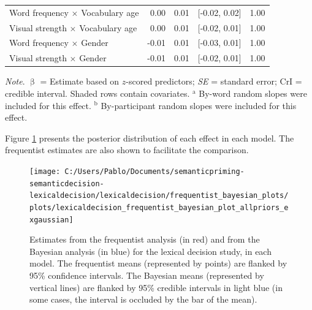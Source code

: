 \documentclass[
  12pt,
  man,floatsintext]{apa7}
\begin{document}
\begin{table}[!h]
\begin{threeparttable}
\begin{tabular}[t]{lrrrr}
\hspace{1em}Word frequency  $\times$  Vocabulary age & 0.00 & 0.01 & {}[-0.02, 0.02] & 1.00\\
\hspace{1em}Visual strength  $\times$  Vocabulary age & 0.00 & 0.01 & {}[-0.02, 0.01] & 1.00\\
\hspace{1em}Word frequency  $\times$  Gender & -0.01 & 0.01 & {}[-0.03, 0.01] & 1.00\\
\hspace{1em}Visual strength  $\times$  Gender & -0.01 & 0.01 & {}[-0.02, 0.01] & 1.00\\
\bottomrule
\end{tabular}
\begin{tablenotes}
\item \textit{\linebreak} 
\item \textit{Note}. $\upbeta$ = Estimate based on $z$-scored predictors; \textit{SE} = standard error; \linebreak \phantom{.}CrI = credible interval. Shaded rows contain covariates. \linebreak \linebreak \phantom{.}$^{\text{a}}$ By-word random slopes were included for this effect. \linebreak \phantom{.}$^{\text{b}}$ By-participant random slopes were included for this effect.
\end{tablenotes}
\end{threeparttable}
\end{table}

\clearpage

Figure \ref{fig:lexicaldecision-frequentist-bayesian-plot-allpriors-exgaussian} presents the posterior distribution of each effect in each model. The frequentist estimates are also shown to facilitate the comparison.

\begin{figure}

{\centering \texttt{[image: C:/Users/Pablo/Documents/semanticpriming-semanticdecision-lexicaldecision/lexicaldecision/frequentist\_bayesian\_plots/plots/lexicaldecision\_frequentist\_bayesian\_plot\_allpriors\_exgaussian]} 

}

\caption{Estimates from the frequentist analysis (in red) and from the Bayesian analysis (in blue) for the lexical decision study, in each model. The frequentist means (represented by points) are flanked by 95\% confidence intervals. The Bayesian means (represented by vertical lines) are flanked by 95\% credible intervals in light blue (in some cases, the interval is occluded by the bar of the mean).}\label{fig:lexicaldecision-frequentist-bayesian-plot-allpriors-exgaussian}
\end{figure}

\clearpage
\end{document}
